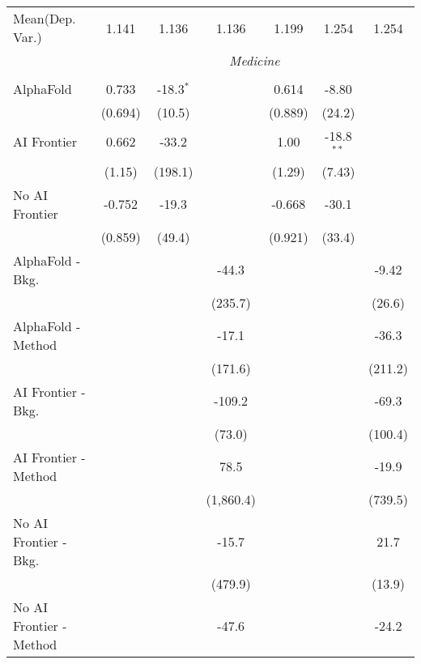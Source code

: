 \begin{tabular}{lcccccc}
Mean(Dep. Var.) & 1.141 & 1.136 & 1.136 & 1.199 & 1.254 & 1.254 \\
 & \multicolumn{6}{c}{\textit{Medicine}} \\ \\
   AlphaFold               & 0.733   & -18.3$^{*}$ &           & 0.614   & -8.80        &   \\   
                           & (0.694) & (10.5)      &           & (0.889) & (24.2)       &   \\   
   AI Frontier             & 0.662   & -33.2       &           & 1.00    & -18.8$^{**}$ &   \\   
                           & (1.15)  & (198.1)     &           & (1.29)  & (7.43)       &   \\   
   No AI Frontier          & -0.752  & -19.3       &           & -0.668  & -30.1        &   \\   
                           & (0.859) & (49.4)      &           & (0.921) & (33.4)       &   \\   
   AlphaFold - Bkg.        &         &             & -44.3     &         &              & -9.42\\   
                           &         &             & (235.7)   &         &              & (26.6)\\   
   AlphaFold - Method      &         &             & -17.1     &         &              & -36.3\\   
                           &         &             & (171.6)   &         &              & (211.2)\\   
   AI Frontier - Bkg.      &         &             & -109.2    &         &              & -69.3\\   
                           &         &             & (73.0)    &         &              & (100.4)\\   
   AI Frontier - Method    &         &             & 78.5      &         &              & -19.9\\   
                           &         &             & (1,860.4) &         &              & (739.5)\\   
   No AI Frontier - Bkg.   &         &             & -15.7     &         &              & 21.7\\   
                           &         &             & (479.9)   &         &              & (13.9)\\   
   No AI Frontier - Method &         &             & -47.6     &         &              & -24.2\\   

\end{tabular}
